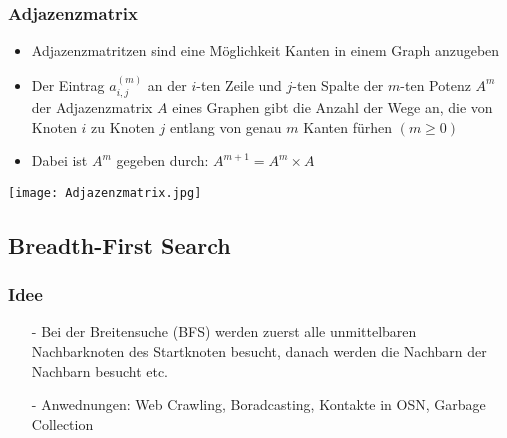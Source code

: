 		\subsubsection{Adjazenzmatrix}
			\begin{minipage}[t]{0.6\textwidth}
				\begin{itemize}
					\item Adjazenzmatritzen sind eine Möglichkeit Kanten in einem Graph anzugeben
					\item Der Eintrag $a^{(m)}_{i,j}$ an der $i$-ten Zeile und $j$-ten Spalte
						der $m$-ten Potenz $A^m$ der Adjazenzmatrix $A$ eines Graphen gibt die Anzahl
						der Wege an, die von Knoten $i$ zu Knoten $j$ entlang von genau $m$ Kanten 
						fürhen $(m\geq0)$
					\item Dabei ist $A^m$ gegeben durch: $A^{m+1} = A^m \times A$ 
				\end{itemize}
			\end{minipage}
			\begin{minipage}[t]{0.35\textwidth}
				\begin{center}
					\texttt{[image: Adjazenzmatrix.jpg]}
				\end{center}
			\end{minipage}

	\newpage
	\subsection{Breadth-First Search}
		\subsubsection{Idee}
			\begin{itemize}
				\item[-] Bei der Breitensuche (BFS) werden zuerst alle unmittelbaren Nachbarknoten
					des Startknoten besucht, danach werden die Nachbarn der Nachbarn besucht etc.
				\item[-] Anwednungen: Web Crawling, Boradcasting, Kontakte in OSN, Garbage Collection
			\end{itemize}

		\vspace{1cm}
